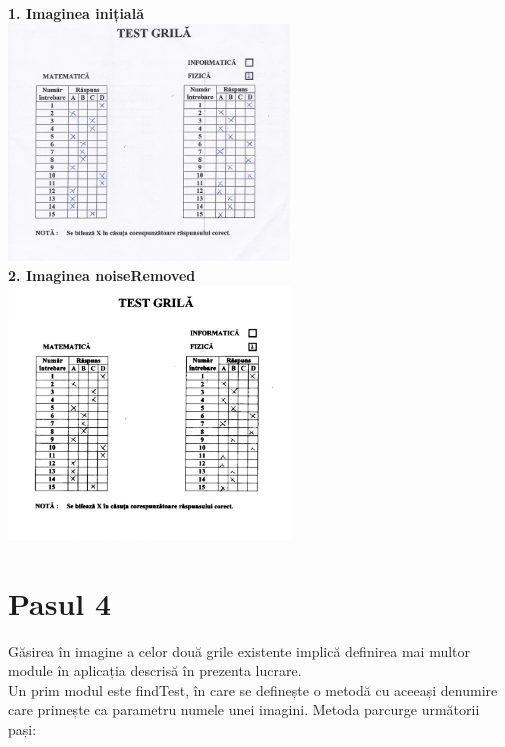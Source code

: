 \documentclass[a4paper,12pt]{report}
\newcommand\tab[1][1cm]{\hspace*{#1}}
\begin{document}
\begin {center} 
	\begin {footnotesize} 
		\textbf  {1. Imaginea inițială} 
		\\
		\includegraphics[width = 75mm]{fig2_5}
		\\ 
		\textbf  {2. Imaginea noiseRemoved} 
		\\
		\includegraphics[width = 75mm]{fig2_7}
		
	\end {footnotesize} 
\end {center}

\section{Pasul 4}
\tab Găsirea în imagine a celor două grile existente implică definirea mai multor module în aplicația descrisă în prezenta lucrare. 
\\ \tab Un prim modul este findTest, în care se definește o metodă cu aceeași denumire care primește ca parametru numele unei imagini. Metoda parcurge următorii pași:
\end{document}
